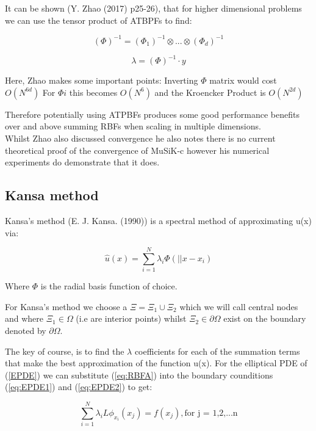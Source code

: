\documentclass[a4paper]{amsart}
\begin{document}
It can be shown (Y. Zhao (2017) \cite{mski0} p25-26),  that for higher dimensional problems we can use the tensor product of ATBPFs to find:

\begin{equation}
(\Phi)^{-1}=(\Phi_{1})^{-1} \otimes ... \otimes  (\Phi_{d})^{-1}
\end{equation}

\begin{equation}
\lambda = (\Phi)^{-1} \cdot y
\end{equation}

Here, Zhao makes some important points:
Inverting $\Phi$ matrix would cost $O(N^{6d})$
For $\Phi{i}$ this becomes $O(N^{6})$
and the Kroencker Product is $O(N^{2d})$

Therefore potentially using ATPBFs produces some good performance benefits over and above summing RBFs when scaling in multiple dimensions.\\

Whilst Zhao also discussed convergence he also notes there is no current theoretical proof of the convergence of MuSiK-c however his numerical experiments do demonstrate that it does.

\subsection{Kansa method} \label{Kansa}

Kansa's method (E. J. Kansa. (1990)\cite{rbf1}\cite{rbf2}) is a spectral method of approximating u(x) via:

\begin{equation} \label{eq:RBFA}
\hat u(x) = \sum^{N}_{i=1} \lambda_{i} \Phi(||x - x_{i})
\end{equation}

Where $\Phi$ is the radial basis function of choice.

For Kansa's method we choose a $\Xi = \Xi_{1} \cup \Xi_{2}$ which we will call central nodes and where $\Xi_{1} \in \Omega$ (i.e are interior points) whilst  $\Xi_{2} \in \partial \Omega$ exist on the boundary denoted by $\partial \Omega$.

The key of course, is to find the $\lambda$ coefficients for each of the summation terms that make the best approximation of the function u(x). For the elliptical PDE of (\ref{EPDE}) we can substitute (\ref{eq:RBFA}) into the boundary counditions (\ref{eq:EPDE1}) and (\ref{eq:EPDE2}) to get:

\begin{equation} \label{eq:Kansa1}
\sum_{i=1}^{N} \lambda_{i} L \phi_{x_{i}}(x_{j}) = f(x_{j}),\mbox{for j = 1,2,...n}
\end{equation}
\end{document}
